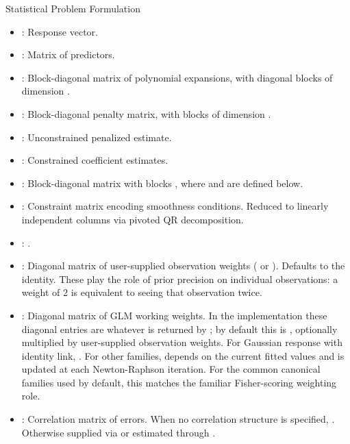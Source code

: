 \begin{Section}{Statistical Problem Formulation}
\begin{itemize}
\item{} : Response vector.
\item{} : Matrix of predictors.
\item{} : Block-diagonal matrix of polynomial
expansions, with diagonal blocks  of dimension
.
\item{} : Block-diagonal penalty matrix,
with blocks  of dimension .
\item{} : Unconstrained penalized
estimate.
\item{} : Constrained coefficient
estimates.
\item{} : Block-diagonal matrix with blocks
,
where  and  are defined below.
\item{} : Constraint matrix encoding smoothness
conditions. Reduced to linearly independent columns via pivoted QR
decomposition.
\item{} :
.
\item{} : Diagonal matrix of user-supplied
observation weights ( or ).
Defaults to the identity. These play the role of prior precision on
individual observations: a weight of 2 is equivalent to seeing that
observation twice.
\item{} : Diagonal matrix of GLM working
weights. In the implementation these diagonal entries are whatever is
returned by ; by default this is
, optionally multiplied by user-supplied
observation weights. For Gaussian response with identity link,
. For other families,
 depends on the current fitted values and is updated at
each Newton-Raphson iteration. For the common canonical families used
by default, this matches the familiar Fisher-scoring weighting role.
\item{} : Correlation matrix of errors.
When no correlation structure is specified, .
Otherwise supplied via  or estimated through
.


\end{itemize}
\end{Section}
